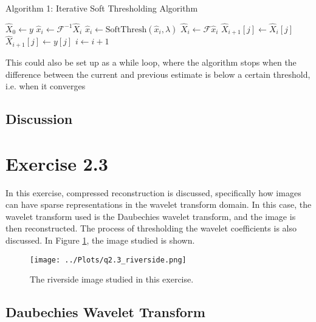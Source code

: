 \documentclass[12pt]{report} %
\begin{document}
\begin{definitionbox}{Algorithm 1: Iterative Soft Thresholding Algorithm}
    \begin{algorithmic}[1]

        \State $\hat{X}_{0} \gets y$ 
         
            \State $\hat{x}_{i} \gets \mathcal{F}^{-1}\hat{X}_{i}$ 
            \State $\hat{x}_{i} \gets \text{SoftThresh}(\hat{x}_{i}, \lambda)$ 
            \State $\hat{X}_{i} \gets \mathcal{F}\hat{x}_{i}$ 
             
                \State $\hat{X}_{i+1}[j] \gets \hat{X}_{i}[j]$
            \Else
                \State $\hat{X}_{i+1}[j] \gets y[j]$
            \EndIf
            \State $i \gets i + 1$
        \EndFor
        \end{algorithmic}
    This could also be set up as a while loop, where the algorithm stops when the difference between the current and previous estimate is below a certain threshold, i.e. when it converges
\end{definitionbox}



\subsection{Discussion}

\section{Exercise 2.3}

In this exercise, compressed reconstruction is discussed, specifically how images can have sparse representations in the wavelet transform domain. In this case, the wavelet transform used is the Daubechies wavelet transform, and the image is then reconstructed. The process of thresholding the wavelet coefficients is also discussed. In Figure \ref{fig:riverside}, the image studied is shown.

\begin{figure}[htbp]
    \centering
    \texttt{[image: ../Plots/q2.3\_riverside.png]}
    \caption{The riverside image studied in this exercise.}
    \label{fig:riverside}
\end{figure}

\subsection{Daubechies Wavelet Transform}
\end{document}
